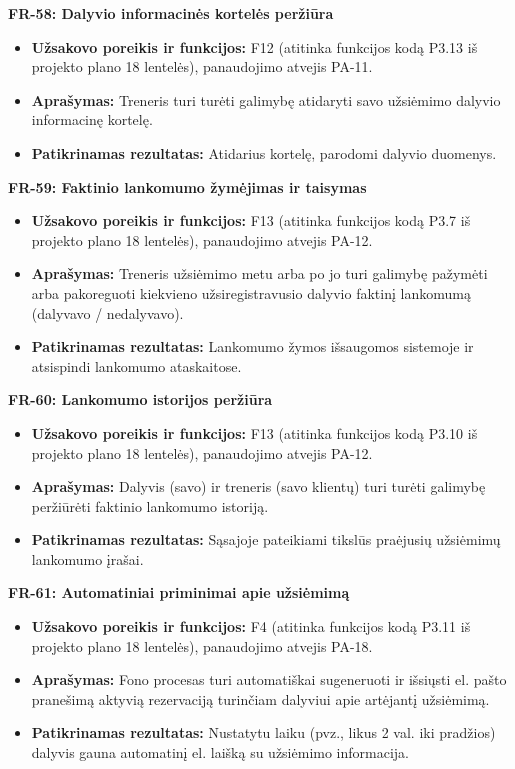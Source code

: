 \vspace{0.3cm}
\noindent\textbf{FR-58: Dalyvio informacinės kortelės peržiūra}
\begin{itemize}
    \item \textbf{Užsakovo poreikis ir funkcijos:} F12 (atitinka funkcijos kodą P3.13 iš projekto plano 18 lentelės), panaudojimo atvejis PA-11.
    \item \textbf{Aprašymas:} Treneris turi turėti galimybę atidaryti savo užsiėmimo dalyvio informacinę kortelę.
    \item \textbf{Patikrinamas rezultatas:} Atidarius kortelę, parodomi dalyvio duomenys.
\end{itemize}

\vspace{0.3cm}
\noindent\textbf{FR-59: Faktinio lankomumo žymėjimas ir taisymas}
\begin{itemize}
    \item \textbf{Užsakovo poreikis ir funkcijos:} F13 (atitinka funkcijos kodą P3.7 iš projekto plano 18 lentelės), panaudojimo atvejis PA-12.
    \item \textbf{Aprašymas:} Treneris užsiėmimo metu arba po jo turi galimybę pažymėti arba pakoreguoti kiekvieno užsiregistravusio dalyvio faktinį lankomumą (dalyvavo / nedalyvavo).
    \item \textbf{Patikrinamas rezultatas:} Lankomumo žymos išsaugomos sistemoje ir atsispindi lankomumo ataskaitose.
\end{itemize}

\vspace{0.3cm}
\noindent\textbf{FR-60: Lankomumo istorijos peržiūra}
\begin{itemize}
    \item \textbf{Užsakovo poreikis ir funkcijos:} F13 (atitinka funkcijos kodą P3.10 iš projekto plano 18 lentelės), panaudojimo atvejis PA-12.
    \item \textbf{Aprašymas:} Dalyvis (savo) ir treneris (savo klientų) turi turėti galimybę peržiūrėti faktinio lankomumo istoriją.
    \item \textbf{Patikrinamas rezultatas:} Sąsajoje pateikiami tikslūs praėjusių užsiėmimų lankomumo įrašai.
\end{itemize}

\vspace{0.3cm}
\noindent\textbf{FR-61: Automatiniai priminimai apie užsiėmimą}
\begin{itemize}
    \item \textbf{Užsakovo poreikis ir funkcijos:} F4 (atitinka funkcijos kodą P3.11 iš projekto plano 18 lentelės), panaudojimo atvejis PA-18.
    \item \textbf{Aprašymas:} Fono procesas turi automatiškai sugeneruoti ir išsiųsti el. pašto pranešimą aktyvią rezervaciją turinčiam dalyviui apie artėjantį užsiėmimą.
    \item \textbf{Patikrinamas rezultatas:} Nustatytu laiku (pvz., likus 2 val. iki pradžios) dalyvis gauna automatinį el. laišką su užsiėmimo informacija.
\end{itemize}

